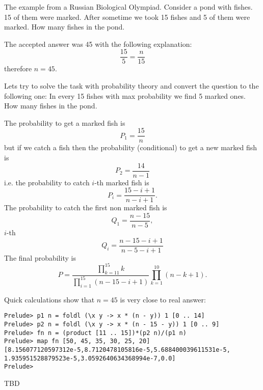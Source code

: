 \begin{example}
The example from a Russian Biological Olympiad. Consider a pond with
fishes. 15 of them were marked. After sometime we took 15 fishes and 5
of them were marked. How many fishes in the pond.

The accepted answer was 45 with the following explanation: 
\[
\frac{15}{5} = \frac{n}{15}
\]
therefore $n=45$.

Lets try to solve the task with probability theory and convert the
question to the following one: In every 15 fishes with max probability
we find 5 marked ones. How many fishes in the pond.

The probability to get a marked fish is
\[
P_1 = \frac{15}{n}
\]
but if we catch a fish then the probability (conditional) to get a new
marked fish is
\[
P_2 = \frac{14}{n-1}
\]
i.e. the probability to catch $i$-th marked fish is
\[
P_i = \frac{15-i+1}{n - i + 1}.
\]
The probability to catch the first non marked fish is
\[
Q_1 = \frac{n - 15}{n - 5},
\]
$i$-th
\[
Q_i = \frac{n -15 -i + 1}{n - 5 - i + 1}
\]
The final probability is
\[
P = \frac{\prod_{k=11}^{15}k}{\prod_{i = 1}^{15}{\left(n - 15 - i +
    1\right)}}\prod_{k=1}^{10}{\left(n -k + 1\right)}.
\]

Quick calculations show that $n=45$ is very close to real answer: 
\begin{verbatim}
Prelude> p1 n = foldl (\x y -> x * (n - y)) 1 [0 .. 14]
Prelude> p2 n = foldl (\x y -> x * (n - 15 - y)) 1 [0 .. 9]
Prelude> fn n = (product [11 .. 15])*(p2 n)/(p1 n)
Prelude> map fn [50, 45, 35, 30, 25, 20]
[8.156077120597312e-5,8.7120478105816e-5,5.688400039611531e-5,
1.935951528879523e-5,3.0592640634368994e-7,0.0]
Prelude> 
\end{verbatim}

\end{example}

TBD \cite{bib:kolmogorov74basic}
